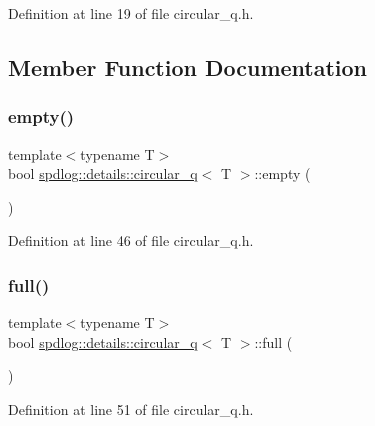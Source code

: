 Definition at line 19 of file circular\+\_\+q.\+h.



\subsection{Member Function Documentation}
\mbox{\label{classspdlog_1_1details_1_1circular__q_ae27eea7ecb58860f4471f473e02270f8}} 
\subsubsection{\texorpdfstring{empty()}{empty()}}
{\footnotesize\ttfamily template$<$typename T$>$ \\
bool \hyperlink{classspdlog_1_1details_1_1circular__q}{spdlog\+::details\+::circular\+\_\+q}$<$ T $>$\+::empty (\begin{DoxyParamCaption}{ }\end{DoxyParamCaption})\hspace{0.3cm}{\ttfamily [inline]}}



Definition at line 46 of file circular\+\_\+q.\+h.

\mbox{\label{classspdlog_1_1details_1_1circular__q_a6f9e90a9957c230376a463b20f909191}} 
\subsubsection{\texorpdfstring{full()}{full()}}
{\footnotesize\ttfamily template$<$typename T$>$ \\
bool \hyperlink{classspdlog_1_1details_1_1circular__q}{spdlog\+::details\+::circular\+\_\+q}$<$ T $>$\+::full (\begin{DoxyParamCaption}{ }\end{DoxyParamCaption})\hspace{0.3cm}{\ttfamily [inline]}}



Definition at line 51 of file circular\+\_\+q.\+h.

